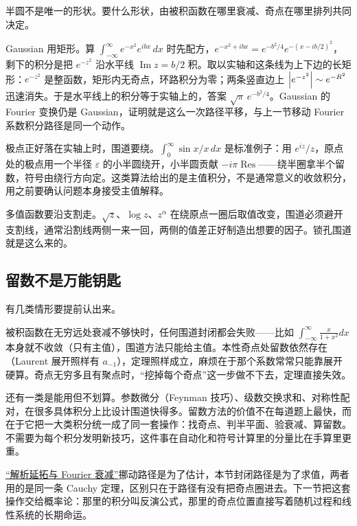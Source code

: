 半圆不是唯一的形状。要什么形状，由被积函数在哪里衰减、奇点在哪里排列共同决定。

Gaussian 用矩形。算 \(\int_{-\infty}^{\infty}e^{-x^2}e^{ibx}\,dx\) 时先配方，\(e^{-x^2+ibx}=e^{-b^2/4}e^{-(x-ib/2)^2}\)，剩下的积分是把 \(e^{-z^2}\) 沿水平线 \(\operatorname{Im}z=b/2\) 积。取以实轴和这条线为上下边的长矩形：\(e^{-z^2}\) 是整函数，矩形内无奇点，环路积分为零；两条竖直边上 \(\left|e^{-z^2}\right|\sim e^{-R^2}\) 迅速消失。于是水平线上的积分等于实轴上的，答案 \(\sqrt\pi\,e^{-b^2/4}\)。Gaussian 的 Fourier 变换仍是 Gaussian，证明就是这么一次路径平移，与上一节移动 Fourier 系数积分路径是同一个动作。

极点正好落在实轴上时，围道要绕。\(\int_0^\infty \sin x/x\,dx\) 是标准例子：用 \(e^{iz}/z\)，原点处的极点用一个半径 \(\varepsilon\) 的小半圆绕开，小半圆贡献 \(-i\pi\operatorname{Res}\)——绕半圈拿半个留数，符号由绕行方向定。这类算法给出的是主值积分，不是通常意义的收敛积分，用之前要确认问题本身接受主值解释。

多值函数要沿支割走。\(\sqrt z\)、\(\log z\)、\(z^{\alpha}\) 在绕原点一圈后取值改变，围道必须避开支割线，通常沿割线两侧一来一回，两侧的值差正好制造出想要的因子。锁孔围道就是这么来的。

\subsection{留数不是万能钥匙}

有几类情形要提前认出来。

被积函数在无穷远处衰减不够快时，任何围道封闭都会失败——比如 \(\int_{-\infty}^{\infty}\frac{x}{1+x^2}dx\) 本身就不收敛（只有主值），围道方法只能给主值。本性奇点处留数依然存在（Laurent 展开照样有 \(a_{-1}\)），定理照样成立，麻烦在于那个系数常常只能靠展开硬算。奇点无穷多且有聚点时，``挖掉每个奇点''这一步做不下去，定理直接失效。

还有一类是能用但不划算。参数微分（Feynman 技巧）、级数交换求和、对称性配对，在很多具体积分上比设计围道快得多。留数方法的价值不在每道题上最快，而在于它把一大类积分统一成了同一套操作：找奇点、判半平面、验衰减、算留数。不需要为每个积分发明新技巧，这件事在自动化和符号计算里的分量比在手算里更重。

\hyperref[sec:08-Numerical-Analysis/09-Complex-Analysis-and-Residues/01]{``解析延拓与 Fourier 衰减''}挪动路径是为了估计，本节封闭路径是为了求值，两者用的是同一条 Cauchy 定理，区别只在于路径有没有把奇点圈进去。下一节把这套操作交给概率论：那里的积分叫反演公式，那里的奇点位置直接写着随机过程和线性系统的长期命运。
